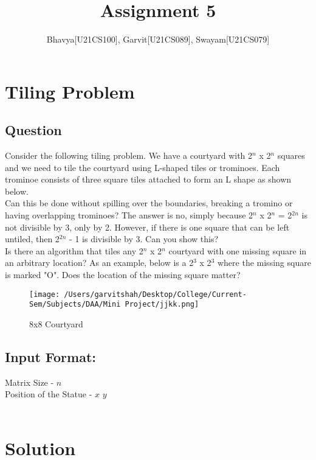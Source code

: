 \documentclass{article}
\title{Assignment 5}
\author{Bhavya[U21CS100], Garvit[U21CS089], Swayam[U21CS079]}
\begin{document}
    \maketitle
    
    \section{Tiling Problem}
    \subsection{Question}
    Consider the following tiling problem. We have a courtyard with 2$^n$ x 2$^n$ squares and 
    we need to tile the courtyard using L-shaped tiles or trominoes. Each trominoe consists 
    of three square tiles attached to form an L shape as shown below.
\\    

    Can this be done without spilling over the boundaries, breaking a tromino or having 
    overlapping trominoes? The answer is no, simply because 2$^n$ x 2$^n$ = 2$^{2n}$ is not divisible by 3, 
    only by 2. However, if there is one square that can be left untiled, then 2$^{2n}$ - 1 is 
    divisible by 3. Can you show this?
\\       

    Is there an algorithm that tiles any 2$^n$ x 2$^n$ courtyard with one missing square in an arbitrary 
    location? As an example, below is a 2$^3$ x 2$^3$ where the missing square is marked "O". Does the 
    location of the missing square matter?
\\

\begin{figure}[h]
  \centering
  \texttt{[image: /Users/garvitshah/Desktop/College/Current-Sem/Subjects/DAA/Mini Project/jjkk.png]}
  \caption{8x8 Courtyard}
  \label{fig:example}
\end{figure}



    \subsection{Input Format:}
        Matrix Size - $n$\\
        Position of the Statue - $x$ $y$\\
    \\


     \newpage
     \section{Solution}
\end{document}
